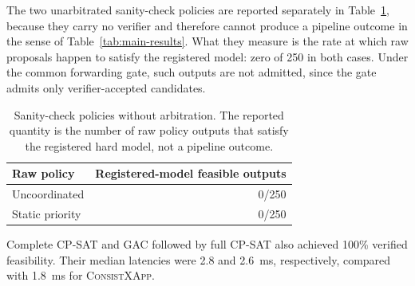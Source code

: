 \documentclass[pdflatex,sn-mathphys-num,iicol,oneside]{sn-jnl}
\newcommand{\method}{\textsc{ConsistXApp}\xspace}
\newcommand{\gac}{\textsc{GAC}\xspace}
\newcommand{\cpsat}{\textsc{CP-SAT}\xspace}
\begin{document}
The two unarbitrated sanity-check policies are reported separately in
Table~\ref{tab:sanity}, because they carry no verifier and therefore
cannot produce a pipeline outcome in the sense of
Table~\ref{tab:main-results}. What they measure is the rate at which
raw proposals happen to satisfy the registered model: zero of 250 in
both cases. Under the common forwarding gate, such outputs are not
admitted, since the gate admits only verifier-accepted candidates.

\begin{table}[t]
\centering
\caption{Sanity-check policies without arbitration. The reported
quantity is the number of raw policy outputs that satisfy the
registered hard model, not a pipeline outcome.}
\label{tab:sanity}
\setlength{\tabcolsep}{4pt}
\small
\begin{tabular}{lr}
\toprule
Raw policy & Registered-model feasible outputs\\
\midrule
Uncoordinated & 0/250\\
Static priority & 0/250\\
\bottomrule
\end{tabular}
\end{table}

Complete \cpsat and \gac followed by full \cpsat also achieved 100\%
verified feasibility. Their median latencies were 2.8 and 2.6~ms,
respectively, compared with 1.8~ms for \method.
\end{document}
